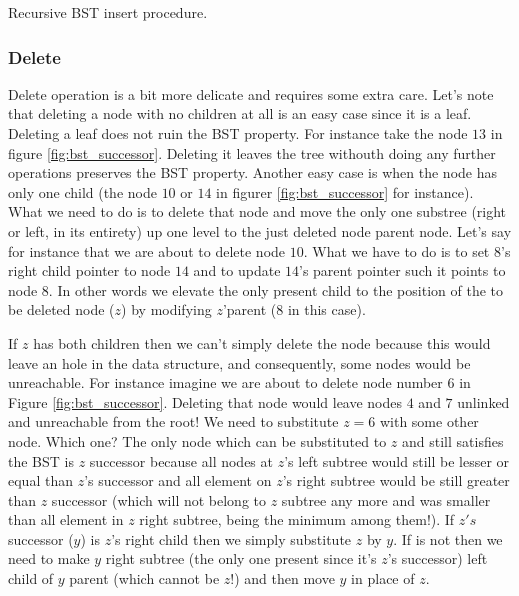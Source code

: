 \begin{algorithm}
\caption{Recursive BST insert procedure.}\label{alg:insert}
\end{algorithm}


\subsubsection{Delete}
Delete operation is a bit more delicate and requires some extra care. Let's note that deleting a node with no children at all is an easy case since it is a leaf. Deleting a leaf does not ruin the BST property.
For instance take the node $13$ in figure \ref{fig:bst_successor}. Deleting it leaves the tree withouth doing any further operations preserves the BST property. Another easy case is when the node has only one child (the node $10$ or $14$ in figurer \ref{fig:bst_successor} for instance).  What we need to do is to delete that node and move the only one substree (right or left, in its entirety) up one level to the just deleted node parent node. 
Let's say for instance that we are about to delete node $10$. What we have to do is to set $8$'s right child pointer to node $14$ and to update $14$'s parent pointer such it points to node $8$. In other words we elevate the only present child   to the position of the to be deleted node ($z$) by modifying $z$'parent ($8$  in this case).

If $z$ has both children then we can't simply delete the node because this would leave an hole in the data structure, and consequently, some nodes would be unreachable. For instance imagine we are about to delete node number $6$ in Figure \ref{fig:bst_successor}. Deleting that node would leave nodes $4$ and $7$ unlinked and unreachable from the root!
We need to substitute $z=6$ with some other node. Which one? The only node which can be substituted to $z$ and still satisfies the BST is $z$ successor because all nodes at $z$'s left subtree would still be lesser or equal than $z$'s successor and all element on $z$'s right subtree would be still greater than $z$ successor (which will not belong to $z$ subtree any more and was smaller than all element in $z$ right subtree, being the minimum among them!).
If $z's$ successor ($y$) is $z$'s right child then we simply substitute $z$ by $y$. 
If is not then we need to make $y$ right subtree (the only one present since it's $z$'s  successor) left child of $y$ parent (which cannot be  $z$!) and then move $y$ in place of $z$.


